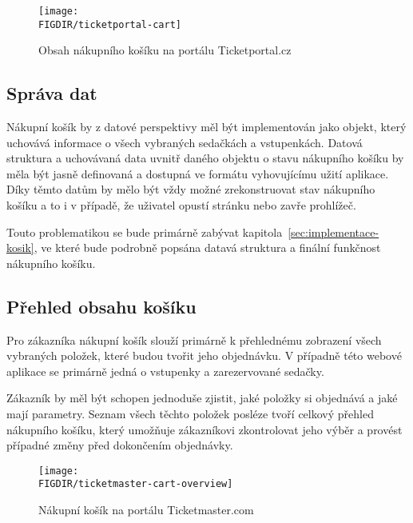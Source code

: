 \begin{figure}[H]
    \texttt{[image: \\FIGDIR/ticketportal-cart]}
    \centering
    \caption{Obsah nákupního košíku na portálu Ticketportal.cz}
    \label{fig:ticketportal-cart}
\end{figure}

\subsection{Správa dat}
\label{subsec:specifikace-nakupni-kosik-sprava}
Nákupní košík by z datové perspektivy měl být implementován jako objekt, který uchovává informace o všech vybraných sedačkách a vstupenkách.
Datová struktura a uchovávaná data uvnitř daného objektu o stavu nákupního košíku by měla být jasně definovaná a dostupná ve formátu vyhovujícímu užití aplikace.
Díky těmto datům by mělo být vždy možné zrekonstruovat stav nákupního košíku a to i v případě, že uživatel opustí stránku nebo zavře prohlížeč.

Touto problematikou se bude primárně zabývat kapitola~\ref{sec:implementace-kosik}, ve které bude podrobně popsána datavá struktura a finální funkčnost nákupního košíku.

\subsection{Přehled obsahu košíku}
\label{subsec:specifikace-nakupni-kosik-prehled}
Pro zákazníka nákupní košík slouží primárně k přehlednému zobrazení všech vybraných položek, které budou tvořit jeho objednávku.
V případně této webové aplikace se primárně jedná o vstupenky a zarezervované sedačky.

Zákazník by měl být schopen jednoduše zjistit, jaké položky si objednává a jaké mají parametry.
Seznam všech těchto položek posléze tvoří celkový přehled nákupního košíku, který umožňuje zákazníkovi zkontrolovat jeho výběr a provést případné změny před dokončením objednávky.

\begin{figure}[H]
    \texttt{[image: \\FIGDIR/ticketmaster-cart-overview]}
    \centering
    \caption{Nákupní košík na portálu Ticketmaster.com}
    \label{fig:ticketmaster-cart-overview}
\end{figure}

